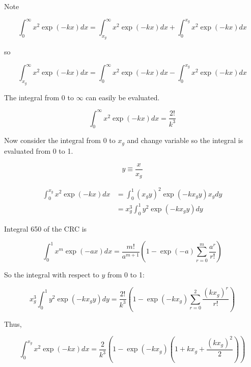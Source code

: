 \documentclass[letterpaper,12pt]{article}
\begin{document}
Note

\begin{equation} \label{eq:09}
\int_{0}^{\infty} x^{2} \exp(-kx) dx = \int_{x_{g}}^{\infty} x^{2} \exp(-kx) dx + \int_{0}^{x_{g}} x^{2} \exp(-kx) dx
\end{equation}

\noindent so

\begin{equation} \label{eq:10}
\int_{x_{g}}^{\infty} x^{2} \exp(-kx) dx = \int_{0}^{\infty} x^{2} \exp(-kx) dx - \int_{0}^{x_{g}} x^{2} \exp(-kx) dx
\end{equation}

The integral from 0 to $\infty$ can easily be evaluated.

\begin{equation} \label{eq:11}
\int_{0}^{\infty} x^{2} \exp(-kx) dx = \frac{2!}{k^{3}}
\end{equation}

Now consider the integral from 0 to $x_{g}$ and change variable so the integral is evaluated from 0 to 1.

\begin{equation} \label{eq:12}
y \equiv \frac{x}{x_{g}}
\end{equation}

\begin{align} \label{eq:13}
\int_{0}^{x_{g}} x^{2} \exp(-kx) dx &= \int_{0}^{1} (x_{g}y)^{2} \exp(-kx_{g}y) x_{g} dy \\
 &= x_{g}^{3} \int_{0}^{1} y^{2} \exp(-kx_{g}y) dy
\end{align}

Integral 650 of the CRC \cite{} is

\begin{equation} \label{eq:14}
\int_{0}^{1} x^{m} \exp(-ax) dx = \frac{m!}{a^{m+1}} \left( 1 - \exp(-a) \sum_{r = 0}^{m} \frac{a^{r}}{r!} \right)
\end{equation}

So the integral with respect to $y$ from 0 to 1:

\begin{equation} \label{eq:15}
x_{g}^{3} \int_{0}^{1} y^{2} \exp(-kx_{g}y) dy = \frac{2!}{k^{3}} \left( 1 - \exp(-kx_{g}) \sum_{r = 0}^{2} \frac{ (kx_{g})^{r} }{r!} \right)
\end{equation}

Thus,

\begin{equation} \label{eq:16}
\int_{0}^{x_{g}} x^{2} \exp(-kx) dx = \frac{2}{k^{3}} \left( 1 - \exp(-kx_{g}) \left(1 + kx_{g} + \frac{ (kx_{g})^{2} }{2} \right) \right)
\end{equation}
\end{document}
